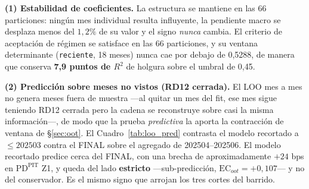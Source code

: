 \documentclass[12pt, a4paper]{article}
\newcommand{\PDPIT}{\ensuremath{\mathrm{PD}^{\mathrm{PIT}}}}
\newcommand{\EC}{\ensuremath{\mathrm{EC}}}
\begin{document}
\textbf{(1) Estabilidad de coeficientes.} La estructura se mantiene en las 66 particiones: ningún
mes individual resulta influyente, la pendiente macro se desplaza menos del $1{,}2\%$ de su valor y
el signo \emph{nunca} cambia. El criterio de aceptación de régimen se satisface en las 66
particiones, y su ventana determinante (\texttt{reciente}, 18 meses) nunca cae por debajo de
0,5288, de manera que conserva \textbf{7,9 puntos de $R^2$} de holgura sobre el umbral de 0,45.

\begin{table}[H]
\centering
\caption{Estabilidad del modelo macro por LOO temporal: FINAL (66 meses) vs las 66 particiones}
\label{tab:loo_coef}
\small
{}%
\end{table}

\textbf{(2) Predicción sobre meses no vistos (RD12 cerrada).} El LOO mes a mes no genera meses
fuera de muestra ---al quitar un mes del fit, ese mes sigue teniendo RD12 cerrada pero la cadena se
reconstruye sobre casi la misma información---, de modo que la prueba \emph{predictiva} la aporta
la contracción de ventana de \S\ref{sec:oot}. El Cuadro~\ref{tab:loo_pred} contrasta el modelo
recortado a $\le202503$ contra el FINAL sobre el agregado de 202504--202506. El modelo recortado
predice cerca del FINAL, con una brecha de aproximadamente $+24$ bps en $\PDPIT$ Z1, y queda del
lado \textbf{estricto} ---sub-predicción, $\EC_{oot}=+0{,}107$--- y no del conservador. Es el mismo
signo que arrojan los tres cortes del barrido.
\end{document}
